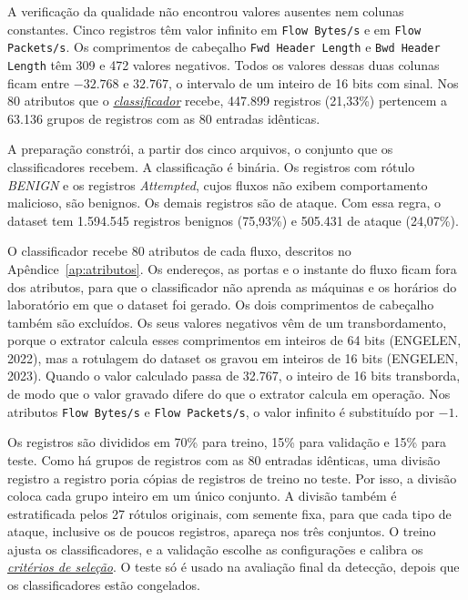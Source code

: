 \documentclass[
  12pt,
  oneside,
  a4paper,
  chapter=TITLE,
  sumario=tradicional,
  english,
  brazil
]{abntex2}
\newcommand{\termo}[2]{\hyperref[gl:#1]{\emph{#2}}}
\begin{document}
A verificação da qualidade não encontrou valores ausentes nem colunas constantes. Cinco registros
têm valor infinito em \texttt{Flow Bytes/s} e em \texttt{Flow Packets/s}. Os comprimentos de
cabeçalho \texttt{Fwd Header Length} e \texttt{Bwd Header Length} têm 309 e 472 valores negativos.
Todos os valores dessas duas colunas ficam entre $-32.768$ e $32.767$, o intervalo de um inteiro de
16 bits com sinal. Nos 80 atributos que o \termo{classificador}{classificador} recebe,
447.899 registros (21,33\%) pertencem a 63.136 grupos de registros com as
80 entradas idênticas.

A preparação constrói, a partir dos cinco arquivos, o conjunto que os classificadores recebem. A
classificação é binária. Os registros com rótulo \emph{BENIGN} e os registros \emph{Attempted},
cujos fluxos não exibem comportamento malicioso, são benignos. Os demais registros são de ataque.
Com essa regra, o dataset tem 1.594.545 registros benignos (75,93\%) e 505.431 de ataque (24,07\%).

O classificador recebe 80 atributos de cada fluxo, descritos no
Apêndice~\ref{ap:atributos}. Os endereços, as portas e o instante do fluxo ficam fora dos atributos,
para que o classificador não aprenda as máquinas e os horários do laboratório em que o dataset foi
gerado. Os dois comprimentos de cabeçalho também são excluídos. Os seus valores negativos
vêm de um transbordamento, porque o extrator calcula esses
comprimentos em inteiros de 64 bits (ENGELEN, 2022), mas a rotulagem do dataset os gravou em
inteiros de 16 bits (ENGELEN, 2023). Quando o valor calculado passa de 32.767, o inteiro de 16 bits transborda, de modo
que o valor gravado difere do que o extrator calcula em operação. Nos atributos
\texttt{Flow Bytes/s} e \texttt{Flow Packets/s}, o valor infinito é substituído por $-1$.

Os registros são divididos em 70\% para treino, 15\% para validação e 15\% para teste. Como há
grupos de registros com as 80 entradas idênticas, uma divisão
registro a registro poria cópias de registros de treino no teste. Por isso, a divisão coloca cada
grupo inteiro em um único conjunto. A divisão também é estratificada pelos 27 rótulos originais, com
semente fixa, para que cada tipo de ataque, inclusive os de poucos registros, apareça nos três
conjuntos. O treino ajusta os
classificadores, e a validação escolhe as configurações e calibra os
\termo{criterio-selecao}{critérios de seleção}. O teste só é usado na avaliação final da detecção,
depois que os classificadores estão congelados.
\end{document}
